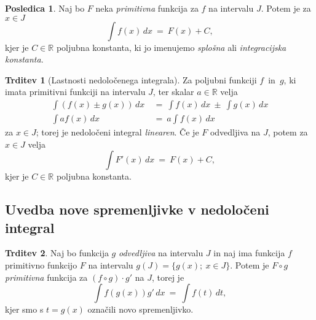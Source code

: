 \documentclass[11pt]{article}
\theoremstyle{definition}
\theoremstyle{definition}
\newtheorem{trditev}{Trditev}[section]
\theoremstyle{definition}
\theoremstyle{theorem}
\newtheorem*{posledica}{Posledica}
\begin{document}
\begin{posledica}

Naj bo $F$ neka \textit{primitivna} funkcija za $f$ na intervalu $J$. Potem je za $x \in J$
$$\int f(x)\,dx ~=~ F(x) + C,$$
kjer je $C \in \mathbb{R}$ poljubna konstanta, ki jo imenujemo \textit{splošna} ali \textit{integracijska konstanta}.

\end{posledica}
\vspace{0.5cm}

\begin{trditev}[Lastnosti nedoločenega integrala]

Za poljubni funkciji \hbox{$f$ in $g$,} ki imata primitivni funkciji na intervalu $J$, ter skalar $a \in \mathbb{R}$ velja
\begin{align*}
\int \left( f(x) \pm g(x) \right)\,dx ~&=~ \int f(x)\,dx ~\pm~ \int g(x)\,dx \\
\int a f(x)\,dx ~&=~ a \int f(x)\,dx
\end{align*}
za $x \in J$; torej je nedoločeni integral \textit{linearen}. Če je $F$ odvedljiva na $J$, potem za $x \in J$ velja
$$\int F'(x)\,dx ~=~ F(x) + C,$$
kjer je $C \in \mathbb{R}$ poljubna konstanta.

\end{trditev}
\vspace{0.5cm}


\subsection{Uvedba nove spremenljivke v nedoločeni integral}
\vspace{0.5cm}

\begin{trditev}

Naj bo funkcija $g$ \textit{odvedljiva} na intervalu $J$ in naj ima funkcija $f$ primitivno funkcijo $F$ na intervalu $g(J) = \{ g(x); ~x \in J \}$. Potem je $F \circ g$ \textit{primitivna} funkcija za $(f \circ g) \cdot g'$ na $J$, torej je
$$\int f \left( g(x) \right) g'\,dx ~=~ \int f(t)\,dt,$$
kjer smo s $t = g(x)$ označili novo spremenljivko.

\end{trditev}
\vspace{0.5cm}

\end{document}
